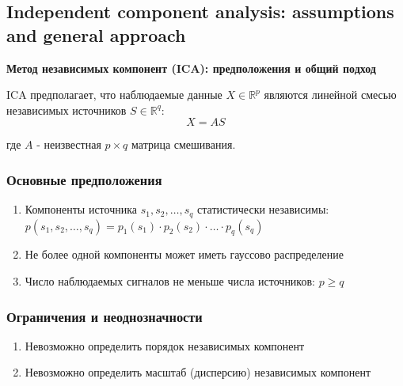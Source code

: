 \documentclass[a4paper,12pt]{article}
\begin{document}
\subsection{Independent component analysis: assumptions and general approach}

\textbf{Метод независимых компонент (ICA): предположения и общий подход}

ICA предполагает, что наблюдаемые данные $X \in \mathbb{R}^p$ являются линейной смесью независимых источников $S \in \mathbb{R}^q$:
$$X = AS$$

где $A$ - неизвестная $p \times q$ матрица смешивания.

\subsubsection{Основные предположения}
\begin{enumerate}
    \item Компоненты источника $s_1, s_2, \ldots, s_q$ статистически независимы: $p(s_1, s_2, \ldots, s_q) = p_1(s_1) \cdot p_2(s_2) \cdot \ldots \cdot p_q(s_q)$
    \item Не более одной компоненты может иметь гауссово распределение
    \item Число наблюдаемых сигналов не меньше числа источников: $p \geq q$
\end{enumerate}

\subsubsection{Ограничения и неоднозначности}
\begin{enumerate}
    \item Невозможно определить порядок независимых компонент
    \item Невозможно определить масштаб (дисперсию) независимых компонент
\end{enumerate}
\end{document}
